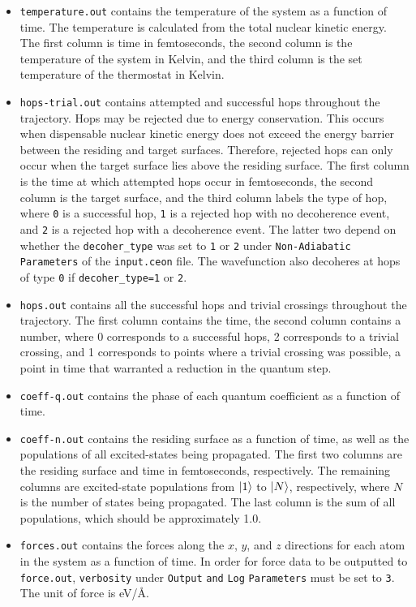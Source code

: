 \documentclass[letterpaper,12pt,titlepage]{article}
\begin{document}
\begin{itemize}
\item \verb+temperature.out+ contains the temperature of the system as a function of time.  The temperature is calculated from the total nuclear kinetic energy.  The first column is time in femtoseconds, the second column is the temperature of the system in Kelvin, and the third column is the set temperature of the thermostat in Kelvin.
\item \verb+hops-trial.out+ contains attempted and successful hops throughout the trajectory.  Hops may be rejected due to energy conservation.  This occurs when dispensable nuclear kinetic energy does not exceed the energy barrier between the residing and target surfaces.  Therefore, rejected hops can only occur when the target surface lies above the residing surface.  The first column is the time at which attempted hops occur in femtoseconds, the second column is the target surface, and the third column labels the type of hop, where \verb+0+ is a successful hop, \verb+1+ is a rejected hop with no decoherence event, and \verb+2+ is a rejected hop with a decoherence event.  The latter two depend on whether the \verb+decoher_type+ was set to \verb+1+ or \verb+2+ under \verb+Non-Adiabatic+ \verb+Parameters+ of the \verb+input.ceon+ file.  The wavefunction also decoheres at hops of type \verb+0+ if \verb+decoher_type=1+ or \verb+2+.
\item \verb+hops.out+ contains all the successful hops and trivial crossings throughout the trajectory.  The first column contains the time, the second column contains a number, where 0 corresponds to a successful hops, 2 corresponds to a trivial crossing, and 1 corresponds to points where a trivial crossing was possible, a point in time that warranted a reduction in the quantum step.  
\item \verb+coeff-q.out+ contains the phase of each quantum coefficient as a function of time.
\item \verb+coeff-n.out+ contains the residing surface as a function of time, as well as the populations of all excited-states being propagated.  The first two columns are the residing surface and time in femtoseconds, respectively.  The remaining columns are excited-state populations from $\ket{1}$ to $\ket{N}$, respectively, where $N$ is the number of states being propagated.  The last column is the sum of all populations, which should be approximately 1.0.
\item \verb+forces.out+ contains the forces along the $x$, $y$, and $z$ directions for each atom in the system as a function of time.  In order for force data to be outputted to \verb+force.out+, \verb+verbosity+ under \verb+Output+ \verb+and+ \verb+Log+ \verb+Parameters+ must be set to \verb+3+.  The unit of force is eV/\AA.

\end{itemize}
\end{document}
